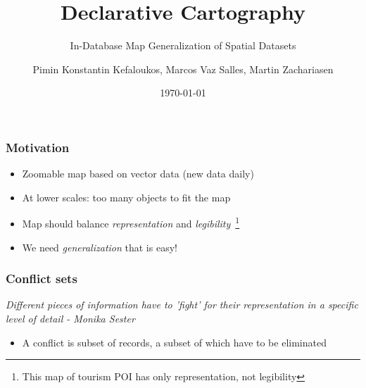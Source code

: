 \documentclass{beamer}
\title{Declarative Cartography}
\subtitle{In-Database Map Generalization of Spatial Datasets}
\author{Pimin Konstantin Kefaloukos, Marcos Vaz Salles, Martin Zachariasen}
\date{\today}
\begin{document}
\frame{\titlepage}

\frame
{
  \frametitle{Motivation}
  \begin{itemize}
  \item Zoomable map based on vector data (new data daily)
  \item At lower scales: too many objects to fit the map
  \item Map should balance \emph{representation} and  \emph{legibility}~\footnote{This map of tourism POI has only representation, not legibility}
  \item We need \emph{generalization} that is easy!
  \end{itemize}

}

\frame
{
  \frametitle{Conflict sets}
  \emph{Different pieces of information have to '{fight}' for their representation in a specific level of detail - Monika Sester}
  
  \begin{center}
  	 
  \end{center}
  
  \begin{itemize}
  \item A conflict is subset of records, a subset of which have to be eliminated
  \end{itemize}
}
\end{document}

